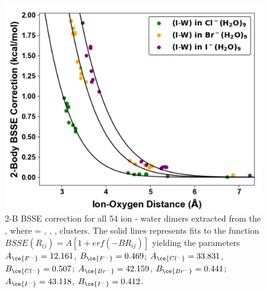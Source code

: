 \begin{figure}[h]
\uwsinglespace
\centering
\includegraphics[width=.8\textwidth]{Figures/Chapter_3/figure_11.pdf}
\caption[2-B BSSE correction for all 54 ion - water dimers extracted from the , where  = , , , clusters.]{2-B BSSE correction for all 54 ion - water dimers extracted from the , where  = , , , clusters. The solid lines represents fits to the function $BSSE(R_{ij})=A[1+erf(-BR_{ij})]$ yielding the parameters  $A_{\ce{F^-}} = 12.161$, $B_{\ce{F^-}} = 0.469$; $A_{\ce{Cl^-}} = 33.831$, $B_{\ce{Cl^-}} =0.507$; $A_{\ce{Br^-}} = 42.159$, $B_{\ce{Br^-}} = 0.441$; $A_{\ce{I^-}} = 43.118$, $B_{\ce{I^-}} = 0.412$.}
\label{fig:MBE_II_11}
\end{figure}